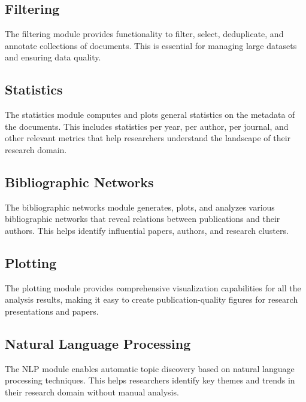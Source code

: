 \subsection{Filtering}

The filtering module provides functionality to filter, select, deduplicate, and annotate collections of documents. This is essential for managing large datasets and ensuring data quality.

\subsection{Statistics}

The statistics module computes and plots general statistics on the metadata of the documents. This includes statistics per year, per author, per journal, and other relevant metrics that help researchers understand the landscape of their research domain.

\subsection{Bibliographic Networks}

The bibliographic networks module generates, plots, and analyzes various bibliographic networks that reveal relations between publications and their authors. This helps identify influential papers, authors, and research clusters.

\subsection{Plotting}

The plotting module provides comprehensive visualization capabilities for all the analysis results, making it easy to create publication-quality figures for research presentations and papers.

\subsection{Natural Language Processing}

The NLP module enables automatic topic discovery based on natural language processing techniques. This helps researchers identify key themes and trends in their research domain without manual analysis.
